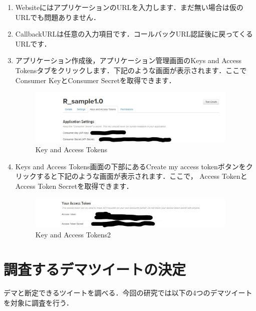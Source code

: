 \begin{enumerate}
\item WebsiteにはアプリケーションのURLを入力します．まだ無い場合は仮のURLでも問題ありません．
\item CallbackURLは任意の入力項目です．コールバックURL認証後に戻ってくるURLです．
\item アプリケーション作成後，アプリケーション管理画面のKeys and Access Tokensタブをクリックします．下記のような画面が表示されます．ここでConsumer KeyとConsumer Secretを取得できます．
\begin{figure}[htb]
\centering
\includegraphics[width=10cm]{12.png}
\caption{Key and Access Tokens}\label{12}
\end{figure}
\newpage
\item Keys and Access Tokens画面の下部にあるCreate my access tokenボタンをクリックすると下記のような画面が表示されます．ここで， Access TokenとAccess Token Secretを取得できます．
\begin{figure}[htb]
\centering
\includegraphics[width=10cm]{13.png}
\caption{Key and Access Tokens2}\label{13}
\end{figure}
\end{enumerate}

\section{調査するデマツイートの決定}
デマと断定できるツイートを調べる．今回の研究では以下の4つのデマツイートを対象に調査を行う．

